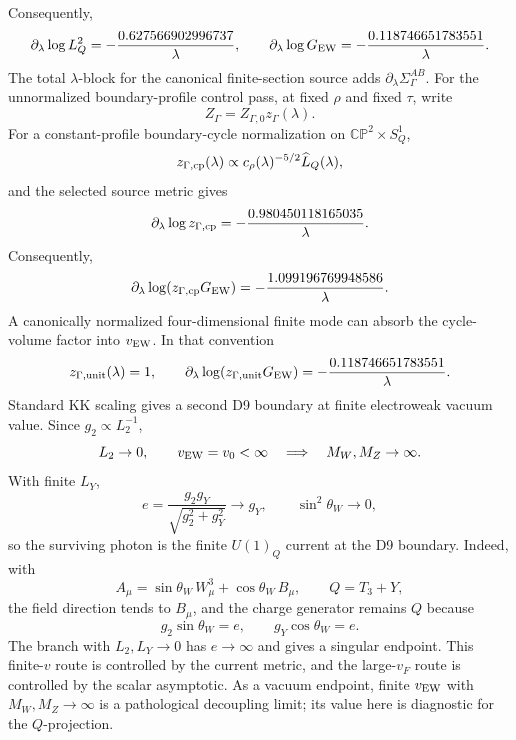 \documentclass[11pt]{article}
\theoremstyle{definition}
\theoremstyle{remark}
\newcommand{\CP}{\mathbb{CP}}
\begin{document}
Consequently,
\[
  \partial_\lambda\log L_Q^2
  =
  -\frac{0.627566902996737}{\lambda},
  \qquad
  \partial_\lambda\log G_{\rm EW}
  =
  -\frac{0.118746651783551}{\lambda}.
\]
The total \(\lambda\)-block for the canonical finite-section source adds
\(\partial_\lambda\Sigma_\Gamma^{AB}\).  For the unnormalized
boundary-profile control pass, at fixed \(\rho\) and fixed \(\tau\), write
\[
  Z_\Gamma=Z_{\Gamma,0}z_\Gamma(\lambda).
\]
For a constant-profile boundary-cycle normalization on
\(\CP^2\times S^1_Q\),
\[
  z_{\Gamma,{\rm cp}}(\lambda)
  \propto
  c_\rho(\lambda)^{-5/2}\widehat L_Q(\lambda),
\]
and the selected source metric gives
\[
  \partial_\lambda\log z_{\Gamma,{\rm cp}}
  =
  -\frac{0.980450118165035}{\lambda}.
\]
Consequently,
\[
  \partial_\lambda\log(z_{\Gamma,{\rm cp}}G_{\rm EW})
  =
  -\frac{1.099196769948586}{\lambda}.
\]
A canonically normalized four-dimensional finite mode can absorb the
cycle-volume factor into \(v_{\rm EW}\).  In that convention
\[
  z_{\Gamma,{\rm unit}}(\lambda)=1,
  \qquad
  \partial_\lambda\log(z_{\Gamma,{\rm unit}}G_{\rm EW})
  =
  -\frac{0.118746651783551}{\lambda}.
\]
Standard KK scaling gives a second D9 boundary at finite electroweak vacuum
value.  Since \(g_2\propto L_2^{-1}\),
\[
  L_2\to0,\qquad v_{\rm EW}=v_0<\infty
  \quad\Longrightarrow\quad
  M_W,M_Z\to\infty .
\]
With finite \(L_Y\),
\[
  e=\frac{g_2g_Y}{\sqrt{g_2^2+g_Y^2}}\to g_Y,
  \qquad
  \sin^2\theta_W\to0,
\]
so the surviving photon is the finite \(U(1)_Q\) current at the D9 boundary.
Indeed, with
\[
  A_\mu=\sin\theta_W\,W^3_\mu+\cos\theta_W\,B_\mu,
  \qquad
  Q=T_3+Y,
\]
the field direction tends to \(B_\mu\), and the charge generator remains
\(Q\) because
\[
  g_2\sin\theta_W=e,
  \qquad
  g_Y\cos\theta_W=e .
\]
The branch with \(L_2,L_Y\to0\) has \(e\to\infty\) and gives a singular
endpoint.  This finite-\(v\) route is controlled by the current metric,
and the large-\(v_F\) route is controlled by the scalar asymptotic.  As a
vacuum endpoint, finite \(v_{\rm EW}\) with \(M_W,M_Z\to\infty\) is a
pathological decoupling limit; its value here is diagnostic for the
\(Q\)-projection.
\end{document}
